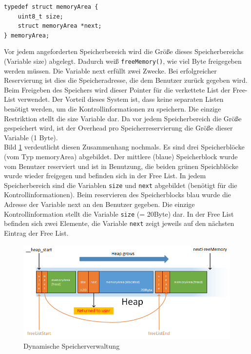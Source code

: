 \documentclass[fontsize=12pt, toc=bibliography, notitlepage]{scrreprt}
\begin{document}
\begin{lstlisting}[title=memory.c]
typedef struct memoryArea {
    uint8_t size;
    struct memoryArea *next;
} memoryArea;
\end{lstlisting}

Vor jedem angeforderten Speicherbereich wird die Größe dieses Speicherbereichs (Variable size) abgelegt. Dadurch weiß \lstinline$freeMemory()$, wie viel Byte freigegeben werden müssen. Die Variable next erfüllt zwei Zwecke. Bei erfolgreicher Reservierung ist dies die Speicheradresse, die dem Benutzer zurück gegeben wird. Beim Freigeben des Speichers wird dieser Pointer für die verkettete List der Free-List verwendet. Der Vorteil dieses System ist, dass keine separaten Listen benötigt werden, um die Kontrollinformationen zu speichern. Die einzige Restriktion stellt die size Variable dar. Da vor jedem Speicherbereich die Größe gespeichert wird, ist der Overhead pro Speicherreservierung die Größe dieser Variable (1 Byte). \\

Bild \ref{fig:memory} verdeutlicht diesen Zusammenhang nochmals. Es sind drei Speicherblöcke (vom Typ memoryArea) abgebildet. Der mittlere (blaue) Speicherblock wurde vom Benutzer reserviert und ist in Benutzung, die beiden grünen Speichblöcke wurde wieder freigegen und befinden sich in der Free List. In jedem Speicherbereich sind die Variablen \lstinline$size$ und \lstinline$next$ abgebildet (benötigt für die Kontrollinformationen). Beim reservieren des Speicherblocks blau wurde die Adresse der Variable next an den Benutzer gegeben. Die einzige Kontrollinformation stellt die Variable \lstinline$size$ (= 20Byte) dar. In der Free List befinden sich zwei Elemente, die Variable \lstinline$next$ zeigt jeweils auf den nächsten Eintrag der Free List.

\begin{figure}[H]
	\centering
	\includegraphics[width=450px]{images/memory.png}
	\caption{Dynamische Speicherverwaltung}
	\label{fig:memory}
\end{figure}
\end{document}
